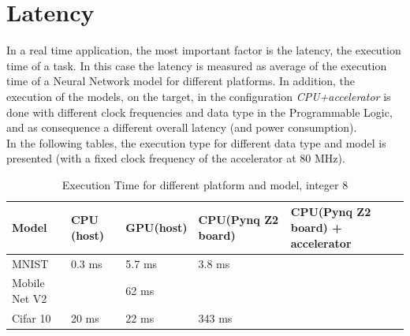 \section{Latency}
In a real time application, the most important factor is the latency, the execution time of a task.
In this case the latency is measured as average of the execution time of a Neural Network model for different platforms. In addition, the execution of the models, on the target, in the configuration \textit{CPU+accelerator} is done with different clock frequencies and data type in the Programmable Logic, and as consequence a different overall latency (and power consumption).\\
In the following tables, the execution type for different data type and model is presented (with a fixed clock frequency of the accelerator at 80 MHz).
\begin{center}
\begin{table}[!htbp]
\centering
\captionsetup{justification=centering}
\begin{tabular}{ |p{2.5cm}||p{2.5cm}|p{2.5cm}|p{2.5cm}|p{2.5cm}| }
\hline
Model & CPU (host)\protect\footnotemark[1] & GPU(host)\protect\footnotemark[1] & CPU(Pynq Z2 board)\protect\footnotemark[3] & CPU(Pynq Z2 board) + accelerator \\
\hline
MNIST & 0.3 ms & 5.7 ms & 3.8 ms  & \\
\hline
Mobile Net V2& & 62 ms & &\\
\hline
Cifar 10& 20 ms & 22 ms& 343 ms &\\
\hline
\end{tabular}
\caption{Execution Time for different platform and model, integer 8}
\label{table:moplatint8}
\end{table}
\end{center}

